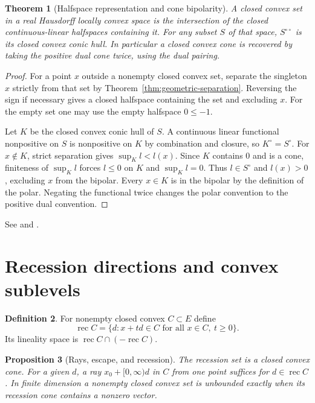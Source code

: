 \documentclass[11pt,oneside,openany]{book}
\theoremstyle{plain}
\newtheorem{theorem}{Theorem}[chapter]
\newtheorem{proposition}[theorem]{Proposition}
\theoremstyle{definition}
\newtheorem{definition}[theorem]{Definition}
\theoremstyle{remark}
\begin{document}
\begin{theorem}[Halfspace representation and cone bipolarity]
\label{thm:cone-bipolar}
A closed convex set in a real Hausdorff locally convex space
is the intersection of the closed continuous-linear halfspaces
containing it. For any subset \(S\) of that space,
\(S^{\circ\circ}\) is its closed convex conic hull. In particular
a closed convex cone is recovered by taking the positive dual
cone twice, using the dual pairing.
\end{theorem}

\begin{proof}
For a point \(x\) outside a nonempty closed convex set, separate
the singleton \(x\) strictly from that set by
Theorem~\ref{thm:geometric-separation}. Reversing the sign if
necessary gives a closed halfspace containing the set and excluding
\(x\). For the empty set one may use the empty halfspace
\(0\le -1\).

Let \(K\) be the closed convex conic hull of \(S\). A continuous
linear functional nonpositive on \(S\) is nonpositive on \(K\)
by combination and closure, so \(K^\circ=S^\circ\).
For \(x\notin K\), strict separation gives
\(\sup_K l<l(x)\). Since \(K\) contains \(0\) and is a cone,
finiteness of \(\sup_K l\) forces \(l\le0\) on \(K\) and
\(\sup_K l=0\). Thus \(l\in S^\circ\) and \(l(x)>0\),
excluding \(x\) from the bipolar. Every \(x\in K\) is
in the bipolar by the definition of the polar. Negating the
functional twice changes the polar convention to the positive
dual convention.
\end{proof}

See \cite[Theorem 11.5 and \S\S13--15]{Rockafellar}
and \cite[\S\S2.5--2.6]{Boyd}.

\section{Recession directions and convex sublevels}\label{v01-06}

\begin{definition}
For nonempty closed convex \(C\subset E\) define
\[
 \operatorname{rec}C
   =\{d:x+td\in C\text{ for all }x\in C,\ t\ge0\}.
\]
Its lineality space is \(\operatorname{rec}C\cap(-\operatorname{rec}C)\).
\end{definition}

\begin{proposition}[Rays, escape, and recession]\label{prop:rec-set}
The recession set is a closed convex cone. For a given \(d\), a
ray \(x_0+[0,\infty)d\) in \(C\) from one point suffices for
\(d\in\operatorname{rec}C\). In finite dimension a nonempty closed
convex set is unbounded exactly when its recession cone contains
a nonzero vector.
\end{proposition}
\end{document}
